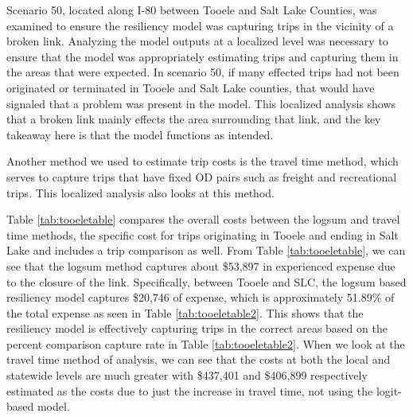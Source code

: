 Scenario 50, located along I-80 between Tooele and Salt Lake Counties, was
examined to ensure the resiliency model was capturing trips in the
vicinity of a broken link. Analyzing the model outputs at a localized
level was necessary to ensure that the model was appropriately estimating
trips and capturing them in the areas that were expected. In scenario 50,
if many effected trips had not been originated or terminated in Tooele and
Salt Lake counties, that would have signaled that a problem was present in
the model. This localized analysis shows that a broken link mainly effects
the area surrounding that link, and the key takeaway here is that the
model functions as intended.

Another method we used to estimate trip costs is the travel time method,
which serves to capture trips that have fixed OD pairs such as freight and
recreational trips. This localized analysis also looks at this method.

Table \ref{tab:tooeletable} compares the overall costs between the logsum and travel
time methods, the specific cost for trips originating in Tooele and ending in Salt
Lake and includes a trip comparison as well. From Table \ref{tab:tooeletable}, we can
see that the logsum method captures about \$53,897 in experienced expense due to the
closure of the link. Specifically, between Tooele and SLC, the logsum based
resiliency model captures \$20,746 of expense, which is approximately 51.89\% of the
total expense as seen in Table \ref{tab:tooeletable2}. This shows that the resiliency
model is effectively capturing trips in the correct areas based on the percent
comparison capture rate in Table \ref{tab:tooeletable2}. When we look at the travel
time method of analysis, we can see that the costs at both the local and statewide
levels are much greater with \$437,401 and \$406,899 respectively estimated as the
costs due to just the increase in travel time, not using the logit-based model.

